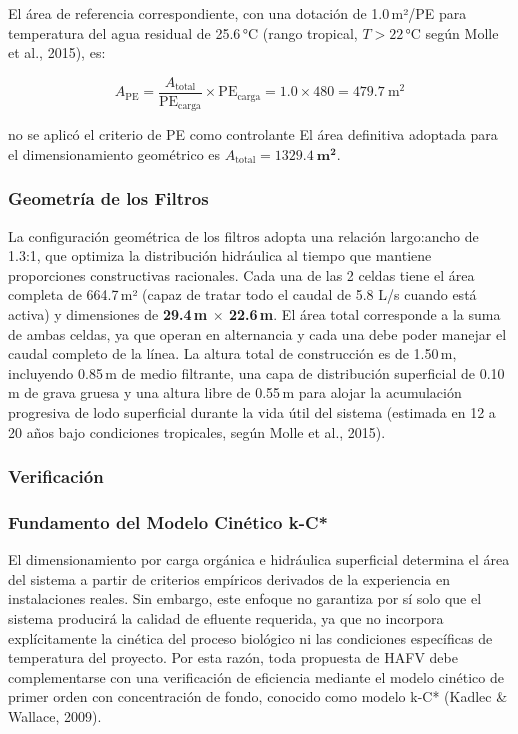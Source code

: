 \documentclass[12pt,a4paper]{article}
\begin{document}
El área de referencia correspondiente, con una dotación de 1.0\,m²/PE para temperatura del agua residual de 25.6\,°C (rango tropical, $T > 22$\,°C según Molle et al., 2015), es:

\begin{equation}
A_\text{PE} = \frac{A_\text{total}}{\text{PE}_\text{carga}} \times \text{PE}_\text{carga} = 1.0 \times 480 = 479.7\ \text{m}^2
\end{equation}

no se aplicó el criterio de PE como controlante El área definitiva adoptada para el dimensionamiento geométrico es $A_\text{total} = \mathbf{1329.4\ \text{m}^2}$.

\subsubsection*{Geometría de los Filtros}

La configuración geométrica de los filtros adopta una relación largo:ancho de 1.3:1, que optimiza la distribución hidráulica al tiempo que mantiene proporciones constructivas racionales. Cada una de las 2 celdas tiene el área completa de 664.7\,m² (capaz de tratar todo el caudal de 5.8 L/s cuando está activa) y dimensiones de \textbf{29.4\,m $\times$ 22.6\,m}. El área total corresponde a la suma de ambas celdas, ya que operan en alternancia y cada una debe poder manejar el caudal completo de la línea. La altura total de construcción es de 1.50\,m, incluyendo 0.85\,m de medio filtrante, una capa de distribución superficial de 0.10\,m de grava gruesa y una altura libre de 0.55\,m para alojar la acumulación progresiva de lodo superficial durante la vida útil del sistema (estimada en 12 a 20 años bajo condiciones tropicales, según Molle et al., 2015).


\subsubsection{Verificación}

\subsubsection*{Fundamento del Modelo Cinético k-C*}

El dimensionamiento por carga orgánica e hidráulica superficial determina el área del sistema a partir de criterios empíricos derivados de la experiencia en instalaciones reales. Sin embargo, este enfoque no garantiza por sí solo que el sistema producirá la calidad de efluente requerida, ya que no incorpora explícitamente la cinética del proceso biológico ni las condiciones específicas de temperatura del proyecto. Por esta razón, toda propuesta de HAFV debe complementarse con una verificación de eficiencia mediante el modelo cinético de primer orden con concentración de fondo, conocido como modelo k-C* (Kadlec \& Wallace, 2009).
\end{document}
